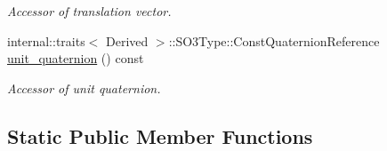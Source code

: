 \begin{DoxyCompactItemize}
\begin{DoxyCompactList}\small\item\em Accessor of translation vector. \end{DoxyCompactList}\item 
internal\+::traits$<$ Derived $>$\+::S\+O3\+Type\+::\+Const\+Quaternion\+Reference \hyperlink{class_sophus_1_1_s_e3_group_base_a4ca1572cb93cddcc95db981fc1f861b2}{unit\+\_\+quaternion} () const 
\begin{DoxyCompactList}\small\item\em Accessor of unit quaternion. \end{DoxyCompactList}\end{DoxyCompactItemize}
\subsection*{Static Public Member Functions}
